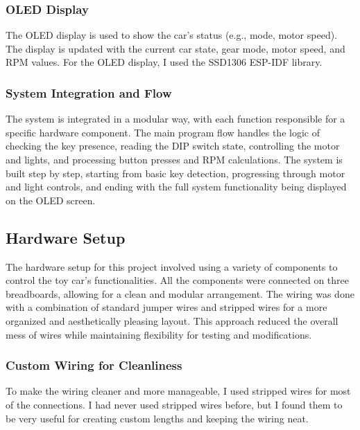 \subsubsection{OLED Display}
The OLED display is used to show the car's status (e.g., mode, motor speed). The display is updated with the current car state, gear mode, motor speed, and RPM values. For the OLED display, I used the SSD1306 ESP-IDF library.

\subsubsection{System Integration and Flow}
The system is integrated in a modular way, with each function responsible for a specific hardware component. The main program flow handles the logic of checking the key presence, reading the DIP switch state, controlling the motor and lights, and processing button presses and RPM calculations. The system is built step by step, starting from basic key detection, progressing through motor and light controls, and ending with the full system functionality being displayed on the OLED screen.

\subsection{Hardware Setup}
The hardware setup for this project involved using a variety of components to control the toy car's functionalities. All the components were connected on three breadboards, allowing for a clean and modular arrangement. The wiring was done with a combination of standard jumper wires and stripped wires for a more organized and aesthetically pleasing layout. This approach reduced the overall mess of wires while maintaining flexibility for testing and modifications.

\subsubsection{Custom Wiring for Cleanliness}
To make the wiring cleaner and more manageable, I used stripped wires for most of the connections. I had never used stripped wires before, but I found them to be very useful for creating custom lengths and keeping the wiring neat.

\newpage